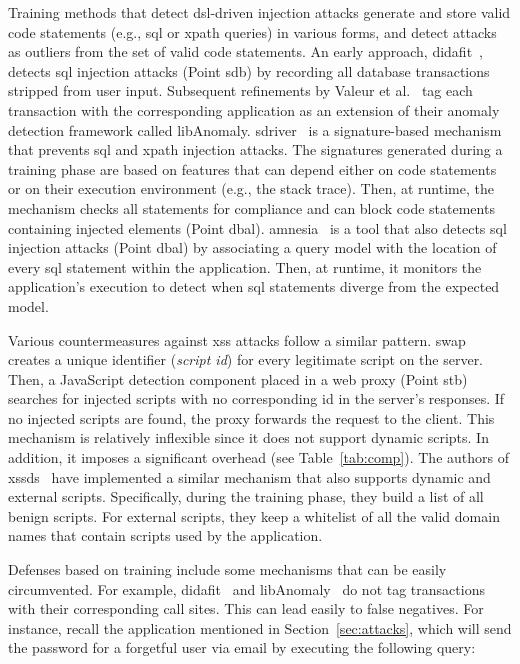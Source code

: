 \documentclass[conference]{IEEEtran}
\begin{document}
Training methods that detect {\sc dsl}-driven injection attacks
generate and store valid code statements (e.g., {\sc sql} or {\sc
  xp}ath queries) in various forms, and detect attacks as outliers
from the set of valid code statements. An early approach,
{\sc didafit}~\cite{LLW02}, detects {\sc sql} injection attacks (Point
{\sc sdb}) by recording all database transactions
stripped from user input. Subsequent
refinements by Valeur et al.~\cite{VMV05} tag each transaction with
the corresponding application as an extension of their anomaly
detection framework called libAnomaly.
{\sc sd}river~\cite{MS09,MKS09,MKLS11} is a signature-based mechanism
that prevents {\sc sql} and {\sc xp}ath injection attacks. The
signatures generated during a training phase are based on features
that can depend either on code statements or on their execution
environment (e.g., the stack trace). Then, at runtime, the mechanism
checks all statements for compliance and can block code statements
containing injected elements (Point {\sc dbal}). {\sc
  amnesia}~\cite{HO05,HO06,HO05b} is a tool that also detects {\sc
  sql} injection attacks (Point {\sc dbal}) by associating a query model
with the location of every {\sc sql} statement within the application.
Then, at runtime, it monitors the application's execution to detect
when {\sc sql} statements diverge from the expected model.

Various countermeasures against {\sc xss} attacks follow a similar
pattern. {\sc swap}~\cite{WPLKK09} creates a unique identifier
({\it script {\sc id}}) for every legitimate script on the server.
Then, a JavaScript detection component placed in a web proxy (Point
{\sc s}t{\sc b}) searches for injected scripts with no corresponding {\sc id}
in the server's responses. If no injected scripts are found, the proxy
forwards the request to the client. This mechanism is relatively
inflexible since it does not support dynamic scripts. In addition, it
imposes a significant overhead (see Table~\ref{tab:comp}). The authors
of {\sc xssds}~\cite{JEP08} have implemented a similar mechanism
that also supports dynamic and external scripts. Specifically, during the
training phase, they build a list of all benign scripts. For
external scripts, they keep a whitelist of all the valid domain names
that contain scripts used by the application.

Defenses based on training include some mechanisms that can be easily
circumvented. For example, {\sc didafit}~\cite{LLW02}
and libAnomaly~\cite{VMV05} do not tag transactions with their
corresponding call sites. This can lead
easily to false negatives. For instance, recall the application
mentioned in Section~\ref{sec:attacks}, which will send the password
for a forgetful user via email by executing the following query:
\end{document}
